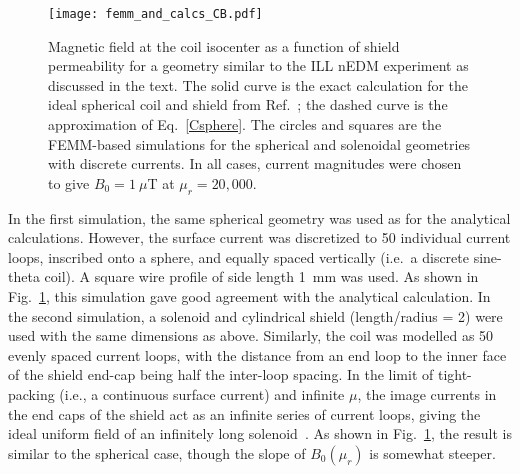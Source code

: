 
\begin{figure}[h!]
\begin{center}
   \texttt{[image: femm\_and\_calcs\_CB.pdf]}
    \caption{Magnetic field at the coil isocenter as a function of shield
      permeability  for a geometry similar to the ILL nEDM
      experiment as discussed in the text.  The solid curve is the exact calculation for the ideal spherical coil and shield from Ref.~\cite{bib:bidinostimartin}; the dashed curve is the approximation of Eq.~\ref{Csphere}. The  circles and squares are the
      FEMM-based simulations for the spherical and solenoidal geometries
      with discrete currents.  In all cases, current magnitudes  were chosen to give $B_0=1~\mu$T at 
      $\mu_r=20,000$.}
    \label{fig:Magnetic_Field}
    \end{center}
\end{figure} 




In the first simulation,
the same spherical geometry was used as for the analytical
calculations.  However, the surface current was discretized to 50
individual current loops, inscribed onto a sphere, and equally spaced
vertically (i.e.~a discrete sine-theta coil).  A square wire profile
of side length 1~mm was used.  As shown in
Fig.~\ref{fig:Magnetic_Field}, this simulation gave good agreement
with the analytical calculation.
%
In the second simulation, a solenoid  and cylindrical shield (length/radius = 2) were used with the same dimensions as above.
Similarly, the coil was modelled as 50 evenly spaced current loops, 
with the distance from an end loop to the inner face of the
shield end-cap being half the inter-loop spacing.  In the limit of tight-packing 
(i.e., a continuous surface current) and  infinite $\mu$, the image currents in the end caps of
the shield act as an infinite series of current loops, giving the ideal uniform field of an 
infinitely  long
solenoid~\cite{bib:lambert,bib:sumner}.
As shown in Fig.~\ref{fig:Magnetic_Field}, the result is similar to the spherical case, though the slope of $B_0(\mu_r)$ is
somewhat steeper.

